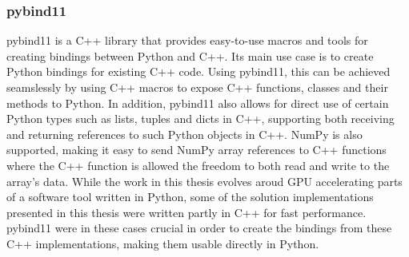 \subsubsection{pybind11} \label{background:implementation_tools_and_libraries:pybind11}
pybind11 \cite{pybind11} is a C++ library that provides easy-to-use macros and tools for creating bindings between Python and C++. 
Its main use case is to create Python bindings for existing C++ code.
Using pybind11, this can be achieved seamslessly by using C++ macros to expose C++ functions, classes and their methods to Python.
In addition, pybind11 also allows for direct use of certain Python types such as lists, tuples and dicts in C++, supporting both receiving and returning references to such Python objects in C++.
NumPy is also supported, making it easy to send NumPy array references to C++ functions where the C++ function is allowed the freedom to both read and write to the array's data.
While the work in this thesis evolves aroud GPU accelerating parts of a software tool written in Python, some of the solution implementations presented in this thesis were written partly in C++ for fast performance.
pybind11 were in these cases crucial in order to create the bindings from these C++ implementations, making them usable directly in Python.
